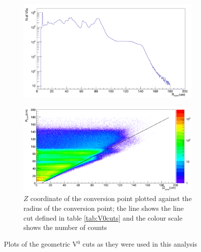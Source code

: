 \begin{figure}
\begin{subfigure}[h]{.4\linewidth}
\includegraphics[width=1.0\linewidth]{Figures/V0cuts/V0radius.png}
\caption{}
\label{fig:V0R}
\end{subfigure}\hspace{1cm}%
\begin{subfigure}[h]{.4\linewidth}
\includegraphics[width=1.0\linewidth]{Figures/V0cuts/V0RvsZwlinecut.png}
\caption{$Z$ coordinate of the conversion point plotted against the radius of the conversion point; the line shows the line cut defined in table \ref{tab:V0cuts} and the colour scale shows the number of counts}
\label{fig:V0linecut}
\end{subfigure}
\vspace{0.5cm}
\caption{Plots of the geometric V$^0$ cuts as they were used in this analysis}
\label{fig:V0cuts}
\end{figure}

